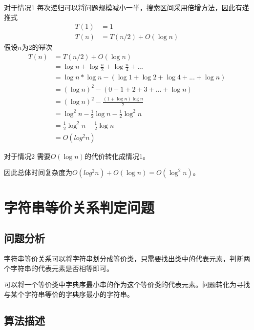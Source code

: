 对于情况1
每次递归可以将问题规模减小一半，搜索区间采用倍增方法，因此有递推式
\begin{equation}
    \begin{aligned}
        T(1) &= 1\\
        T(n) & =T(n/2) + O(\log n)
    \end{aligned}
    \nonumber
\end{equation}
假设$n$为2的幂次
\begin{equation}
    \begin{aligned}
        T(n) &= T(n/2) + O(\log n)\\
            &= \log n + \log \frac{n}{2} + \log \frac{n}{4} + ...\\
            &= \log n * \log n - (\log 1 + \log 2 + \log 4 + ... + \log n)\\
            &= (\log n) ^ 2 - (0+1+2+3+...+\log n)\\
            &= (\log n)^2 - \frac{(1+\log n)\log n}{2}\\
            &= \log^2 n - \frac{1}{2}\log n - \frac{1}{2} \log^2 n\\
            &= \frac{1}{2} \log^2 n - \frac{1}{2} \log n\\
            &= O(log^2 n)
    \end{aligned}
    \nonumber
\end{equation}

对于情况2
需要$O(\log n)$的代价转化成情况1。

因此总体时间复杂度为$O(log^2 n) + O(\log n) = O(\log ^2 n)$。

\section{字符串等价关系判定问题}

\subsection*{问题分析}

字符串等价关系可以将字符串划分成等价类，只需要找出类中的代表元素，判断两个字符串的代表元素是否相等即可。

可以将一个等价类中字典序最小串的作为这个等价类的代表元素。问题转化为寻找与某个字符串等价的字典序最小的字符串。

\subsection*{算法描述}


